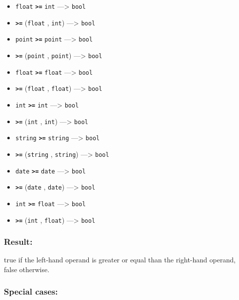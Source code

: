 \documentclass[]{book}
\providecommand{\tightlist}{%
  \setlength{\itemsep}{0pt}\setlength{\parskip}{0pt}}
\theoremstyle{definition}
\theoremstyle{definition}
\theoremstyle{definition}
\theoremstyle{remark}
\begin{document}
\begin{itemize}
\tightlist
\item
  \texttt{float} \textbf{\texttt{\textgreater{}=}} \texttt{int}
  ---\textgreater{} \texttt{bool}
\item
  \textbf{\texttt{\textgreater{}=}} (\texttt{float} , \texttt{int})
  ---\textgreater{} \texttt{bool}
\item
  \texttt{point} \textbf{\texttt{\textgreater{}=}} \texttt{point}
  ---\textgreater{} \texttt{bool}
\item
  \textbf{\texttt{\textgreater{}=}} (\texttt{point} , \texttt{point})
  ---\textgreater{} \texttt{bool}
\item
  \texttt{float} \textbf{\texttt{\textgreater{}=}} \texttt{float}
  ---\textgreater{} \texttt{bool}
\item
  \textbf{\texttt{\textgreater{}=}} (\texttt{float} , \texttt{float})
  ---\textgreater{} \texttt{bool}
\item
  \texttt{int} \textbf{\texttt{\textgreater{}=}} \texttt{int}
  ---\textgreater{} \texttt{bool}
\item
  \textbf{\texttt{\textgreater{}=}} (\texttt{int} , \texttt{int})
  ---\textgreater{} \texttt{bool}
\item
  \texttt{string} \textbf{\texttt{\textgreater{}=}} \texttt{string}
  ---\textgreater{} \texttt{bool}
\item
  \textbf{\texttt{\textgreater{}=}} (\texttt{string} , \texttt{string})
  ---\textgreater{} \texttt{bool}
\item
  \texttt{date} \textbf{\texttt{\textgreater{}=}} \texttt{date}
  ---\textgreater{} \texttt{bool}
\item
  \textbf{\texttt{\textgreater{}=}} (\texttt{date} , \texttt{date})
  ---\textgreater{} \texttt{bool}
\item
  \texttt{int} \textbf{\texttt{\textgreater{}=}} \texttt{float}
  ---\textgreater{} \texttt{bool}
\item
  \textbf{\texttt{\textgreater{}=}} (\texttt{int} , \texttt{float})
  ---\textgreater{} \texttt{bool}
\end{itemize}

\subsubsection{Result:}\label{result-14}

true if the left-hand operand is greater or equal than the right-hand
operand, false otherwise.

\subsubsection{Special cases:}\label{special-cases-12}
\end{document}
